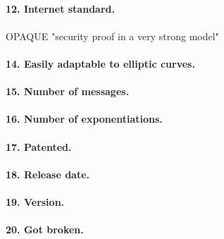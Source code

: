 \documentclass[../report.tex]{subfiles}
\begin{document}
\paragraph{12. Internet standard.}

\paragraph{}
OPAQUE "security proof in a very strong model"

\paragraph{14. Easily adaptable to elliptic curves.}


\paragraph{15. Number of messages.}


\paragraph{16. Number of exponentiations.}


\paragraph{17. Patented.}


\paragraph{18. Release date.}


\paragraph{19. Version.}


\paragraph{20. Got broken.}
\end{document}
